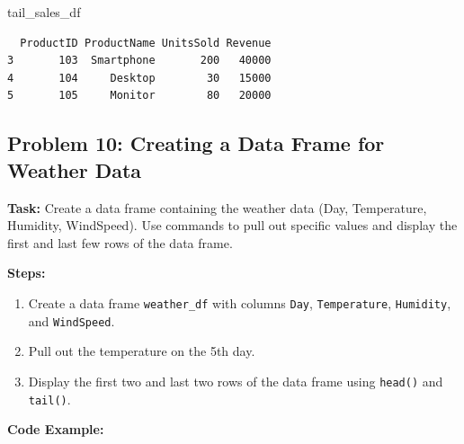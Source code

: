\documentclass[
  letterpaper,
  DIV=11,
  numbers=noendperiod]{scrreprt}
\newenvironment{Shaded}{\begin{snugshade}}{\end{snugshade}}
\newcommand{\NormalTok}[1]{\textcolor[rgb]{0.00,0.23,0.31}{#1}}
\providecommand{\tightlist}{%
  \setlength{\itemsep}{0pt}\setlength{\parskip}{0pt}}\usepackage{longtable,booktabs,array}
\begin{document}
\begin{Shaded}
\begin{Highlighting}[]
\NormalTok{tail\_sales\_df}
\end{Highlighting}
\end{Shaded}

\begin{verbatim}
  ProductID ProductName UnitsSold Revenue
3       103  Smartphone       200   40000
4       104     Desktop        30   15000
5       105     Monitor        80   20000
\end{verbatim}

\subsection*{Problem 10: Creating a Data Frame for Weather
Data}\label{problem-10-creating-a-data-frame-for-weather-data}

\textbf{Task:} Create a data frame containing the weather data (Day,
Temperature, Humidity, WindSpeed). Use commands to pull out specific
values and display the first and last few rows of the data frame.

\textbf{Steps:}

\begin{enumerate}
\def\labelenumi{\arabic{enumi}.}
\tightlist
\item
  Create a data frame \texttt{weather\_df} with columns \texttt{Day},
  \texttt{Temperature}, \texttt{Humidity}, and \texttt{WindSpeed}.
\item
  Pull out the temperature on the 5th day.
\item
  Display the first two and last two rows of the data frame using
  \texttt{head()} and \texttt{tail()}.
\end{enumerate}

\textbf{Code Example:}
\end{document}
